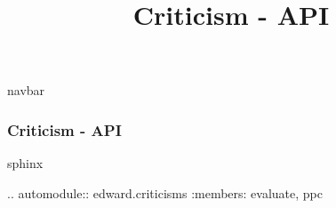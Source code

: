 \title{Criticism - API}

{{navbar}}

\subsubsection{Criticism - API}

{{sphinx

.. automodule:: edward.criticisms
   :members: evaluate,
             ppc

}}
